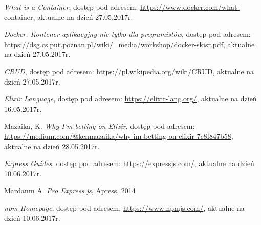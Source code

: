\documentclass[mgr,oneside]{mgr}
\begin{document}
\begin{thebibliography}{inteligencja}
  \emph{What is a Container}, dostęp pod adresem: \url{https://www.docker.com/what-container}, aktualne na dzień 27.05.2017r.

  \emph{Docker. Kontener aplikacyjny nie tylko dla programistów}, dostęp pod adresem: \url{https://dsg.cs.put.poznan.pl/wiki/_media/workshop/docker-skisr.pdf}, aktualne na dzień 27.05.2017r.

  \emph{CRUD}, dostęp pod adresem: \url{https://pl.wikipedia.org/wiki/CRUD}, aktualne na dzień 27.05.2017r.

  \emph{Elixir Language}, dostęp pod adresem: \url{https://elixir-lang.org/}, aktualne na dzień 16.05.2017r.

  Mazaika, K. \emph{Why I'm betting on Elixir}, dostęp pod adresem: \url{https://medium.com/@kenmazaika/why-im-betting-on-elixir-7c8f847b58}, aktualne na dzień 28.05.2017r.

  \emph{Express Guides}, dostęp pod adresem: \url{https://expressjs.com/}, aktualne na dzień 10.06.2017r.

  Mardanm A. \emph{Pro Express.js}, Apress, 2014

  \emph{npm Homepage}, dostęp pod adresem: \url{https://www.npmjs.com/}, aktualne na dzień 10.06.2017r.

\end{thebibliography}
\end{document}
